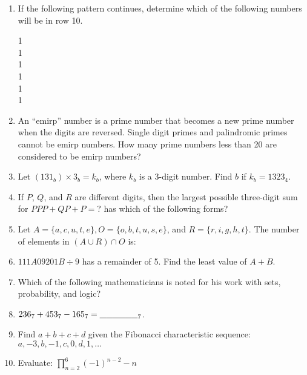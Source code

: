 \documentclass[../uilmath.tex]{subfiles}
\begin{document}
\begin{enumerate}[label=\bfseries\arabic*.]
    \item %
    If the following pattern continues, determine which of the following numbers will be in row 10.
    \begin{center}
        1 \qquad {}\\
        1  \qquad {}\\
        1   \qquad {}\\
        1   \qquad {}\\
        1     \qquad {}\\
        1     \qquad {}
    \end{center}

    \item %
    An ``emirp'' number is a prime number that becomes a new prime number when the digits are reversed. Single digit primes and 
    palindromic primes cannot be emirp numbers. How many prime numbers less than 20 are considered to be emirp numbers?

    \item %
    Let $(131_b)\times 3_b = k_b$, where $k_b$ is a 3-digit number. Find $b$ if $k_b = 1323_4$.

    \item %
    If $P$, $Q$, and $R$ are different digits, then the largest possible three-digit sum for $PPP+QP+P=$? has which of the following forms?

    \item %
    Let $A=\{a,c,u,t,e\}, O=\{o,b,t,u,s,e\}$, and $R=\{r,i,g,h,t\}$. The number of elements in $(A\cup R)\cap O$ is:

    \item %
    $111A09201B\div 9$ has a remainder of 5. Find the least value of $A+B$.

    \item %
    Which of the following mathematicians is noted for his work with sets, probability, and logic?
    
    \item %
    $236_7 + 453_7 - 165_7 = \_\_\_\_\_\__7$.

    \item %
    Find $a+b+c+d$ given the Fibonacci characteristic sequence: $a,-3,b,-1,c,0,d,1,\dots$

    \item %
    Evaluate: $\prod_{n=2}^6 (-1)^{n-2}-n$


\end{enumerate}
\end{document}
